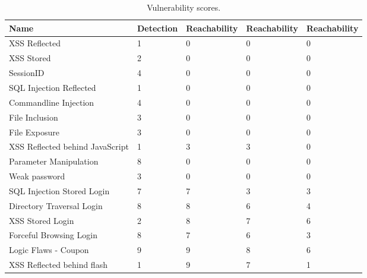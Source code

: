   \begin{table}[t]
      {\scriptsize
        \begin{tabular}{|p{25ex}|l|p{12ex}|p{12ex}|p{12ex}|}
          \hline
          Name                             &  Detection  &  \initial{} Reachability  &  \config{} Reachability  &  \manual{} Reachability  \\
          \hline
          XSS Reflected                    &       1  &             0  &            0  &            0  \\
          XSS Stored                       &       2  &             0  &            0  &            0  \\
          SessionID                        &       4  &             0  &            0  &            0  \\
          SQL Injection Reflected          &       1  &             0  &            0  &            0  \\
          Commandline Injection            &       4  &             0  &            0  &            0  \\
          File Inclusion                   &       3  &             0  &            0  &            0  \\
          File Exposure                    &       3  &             0  &            0  &            0  \\
          \parbox[t]{25ex}{\raggedright XSS Reflected behind JavaScript}  &       1  &             3  &            3  &            0  \\
          Parameter Manipulation           &       8  &             0  &            0  &            0  \\
          Weak password                    &       3  &             0  &            0  &            0  \\
          SQL Injection Stored Login       &       7  &             7  &            3  &            3  \\
          Directory Traversal Login        &       8  &             8  &            6  &            4  \\
          XSS Stored Login                 &       2  &             8  &            7  &            6  \\
          Forceful Browsing Login          &       8  &             7  &            6  &            3  \\
          Logic Flaws - Coupon             &       9  &             9  &            8  &            6  \\
          XSS Reflected behind flash       &       1  &             9  &            7  &            1  \\
          \hline
      \end{tabular}}
      \caption{Vulnerability scores.}
  \end{table}
